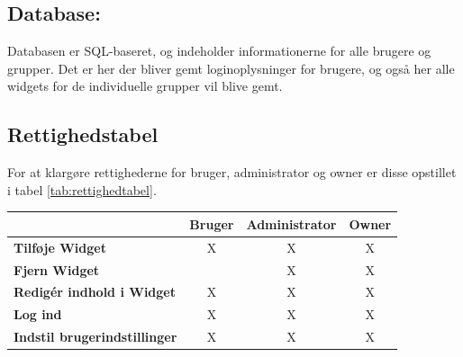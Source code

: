 \subsection{Database:}
Databasen er SQL-baseret, og indeholder informationerne for alle brugere og grupper. Det er her der bliver gemt loginoplysninger for brugere, og også her alle widgets for de individuelle grupper vil blive gemt.

\subsection{Rettighedstabel}
For at klargøre rettighederne for bruger, administrator og owner er disse opstillet i tabel \ref{tab:rettighedtabel}.

\begin{table}[h]
\centering
\begin{tabular}{lccc}
\cline{2-4}
\multicolumn{1}{l|}{}                                                                                                         & \multicolumn{1}{l|}{\textbf{Bruger}} & \multicolumn{1}{l|}{\textbf{Administrator}} & \multicolumn{1}{l|}{\textbf{Owner}} \\ \hline
\multicolumn{1}{|l|}{\textbf{Tilføje Widget}}                                                                                 & \multicolumn{1}{c|}{X}               & \multicolumn{1}{c|}{X}                      & \multicolumn{1}{c|}{X}              \\ \hline
\multicolumn{1}{|l|}{\textbf{Fjern Widget}}                                                                                   & \multicolumn{1}{c|}{}                & \multicolumn{1}{c|}{X}                      & \multicolumn{1}{c|}{X}              \\ \hline
\multicolumn{1}{|l|}{\textbf{Redigér indhold i Widget}}                                                                                 & \multicolumn{1}{c|}{X}               & \multicolumn{1}{c|}{X}                      & \multicolumn{1}{c|}{X}              \\ \hline
\multicolumn{1}{|l|}{\textbf{Log ind}}                                                                                        & \multicolumn{1}{c|}{X}               & \multicolumn{1}{c|}{X}                      & \multicolumn{1}{c|}{X}              \\ \hline
\multicolumn{1}{|l|}{\textbf{Indstil brugerindstillinger}}                                                                    & \multicolumn{1}{c|}{X}               & \multicolumn{1}{c|}{X}                      & \multicolumn{1}{c|}{X}              \\ \hline

\end{tabular}
\end{table}
